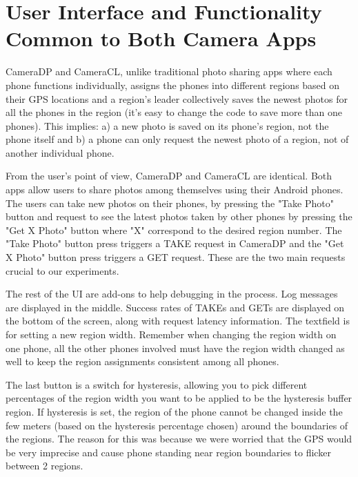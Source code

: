 \chapter{User Interface and Functionality Common to Both Camera Apps}

CameraDP and CameraCL, unlike traditional photo sharing apps where each phone functions individually, assigns the phones into different regions based on their GPS locations and a region's leader collectively saves the newest photos for all the phones in the region (it's easy to change the code to save more than one phones). This implies: a) a new photo is saved on its phone's region, not the phone itself and b) a phone can only request the newest photo of a region, not of another individual phone. 

From the user's point of view, CameraDP and CameraCL are identical. Both apps allow users to share photos among themselves using their Android phones.  The users can take new photos on their phones, by pressing the "Take Photo" button and request to see the latest photos taken by other phones by pressing the "Get X Photo" button where "X" correspond to the desired region number.  The "Take Photo" button press triggers a TAKE request in CameraDP and the "Get X Photo" button press triggers a GET request. These are the two main requests crucial to our experiments.

The rest of the UI are add-ons to help debugging in the process. Log messages are displayed in the middle. Success rates of TAKEs and GETs are displayed on the bottom of the screen, along with request latency information. The textfield is for setting a new region width. Remember when changing the region width on one phone, all the other phones involved must have the region width changed as well to keep the region assignments consistent among all phones. 

The last button is a switch for hysteresis, allowing you to pick different percentages of the region width you want to be applied to be the hysteresis buffer region. If hysteresis is set, the region of the phone cannot be changed inside the few meters (based on the hysteresis percentage chosen) around the boundaries of the regions. The reason for this was because we were worried that the GPS would be very imprecise and cause phone standing near region boundaries to flicker between 2 regions.  

